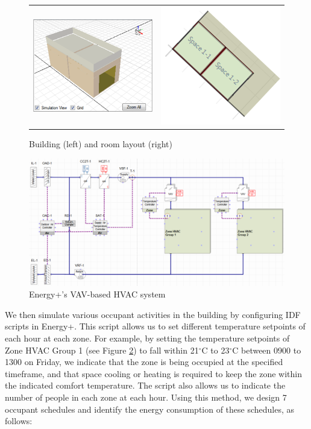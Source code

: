 \begin{figure}[h]
\centering
\begin{tabular}{cc}
\includegraphics[width=2.3in,keepaspectratio]{figs/app_buildings.png} &
\includegraphics[width=2.3in,keepaspectratio]{figs/app_layout.png} \\
\end{tabular}
\caption{Building (left) and room layout (right)}
\label{fig:ep}
\end{figure}

\begin{figure}
	\centering
		\includegraphics[width=0.9\linewidth,keepaspectratio]{./figs/app_hvac.png}		
	\caption{Energy+'s VAV-based HVAC system}
	\label{fig:epvav}
\end{figure}

We then simulate various occupant activities in the building by configuring IDF scripts in Energy+. This script allows us to set different temperature setpoints of each hour at each zone. For example, by setting the temperature setpoints of Zone HVAC Group 1 (see Figure \ref{fig:epvav}) to fall within 21$^\circ$C to 23$^\circ$C between 0900 to 1300 on Friday, we indicate that the zone is being occupied at the specified timeframe, and that space cooling or heating is required to keep the zone within the indicated comfort temperature. The script also allows us to indicate the number of people in each zone at each hour. Using this method, we design 7 occupant schedules and identify the energy consumption of these schedules, as follows:


